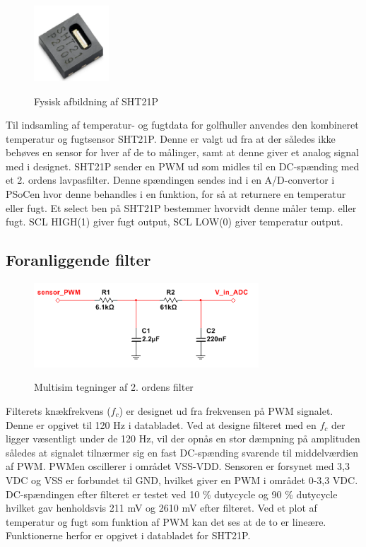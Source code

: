 
\begin{figure}[htb]
\centering
{\includegraphics[width=0.25\textwidth]{filer/design/Billeder/sht21p_fysisk.png}}
\caption{Fysisk afbildning af SHT21P}
\label{lab:sht_filter}
\end{figure}

Til indsamling af temperatur- og fugtdata for golfhuller anvendes den kombineret temperatur og fugtsensor SHT21P. Denne er valgt ud fra at der således ikke behøves en sensor for hver af de to målinger, samt at denne giver et analog signal med i designet. SHT21P sender en PWM ud som midles til en DC-spænding med et 2. ordens lavpasfilter. Denne spændingen sendes ind i en A/D-convertor i PSoCen hvor denne behandles i en funktion, for så at returnere en temperatur eller fugt. Et select ben på SHT21P bestemmer hvorvidt denne måler temp. eller fugt. SCL HIGH(1) giver fugt output, SCL LOW(0) giver temperatur output.

\subsection{Foranliggende filter}
\begin{figure}[htb]
\centering
{\includegraphics[width=0.75\textwidth]{filer/design/Billeder/sht21p_filter_pic.png}}
\caption{Multisim tegninger af 2. ordens filter}
\label{lab:sht_filter_pic}
\end{figure}

Filterets knækfrekvens ($f_c$) er designet ud fra frekvensen på PWM signalet. Denne er opgivet til 120 Hz i databladet. Ved at designe filteret med en $f_c$ der ligger væsentligt under de 120 Hz, vil der opnås en stor dæmpning på amplituden således at signalet tilnærmer sig en fast DC-spænding svarende til middelværdien af PWM. PWMen oscillerer i området VSS-VDD. Sensoren er forsynet med 3,3 VDC og VSS er forbundet til GND, hvilket giver en PWM i området 0-3,3 VDC. DC-spændingen efter filteret er testet ved 10 \% dutycycle og 90 \% dutycycle hvilket gav henholdsvis 211 mV og 2610 mV efter filteret. Ved et plot af temperatur og fugt som funktion af PWM kan det ses at de to er lineære. Funktionerne herfor er opgivet i databladet for SHT21P. 


